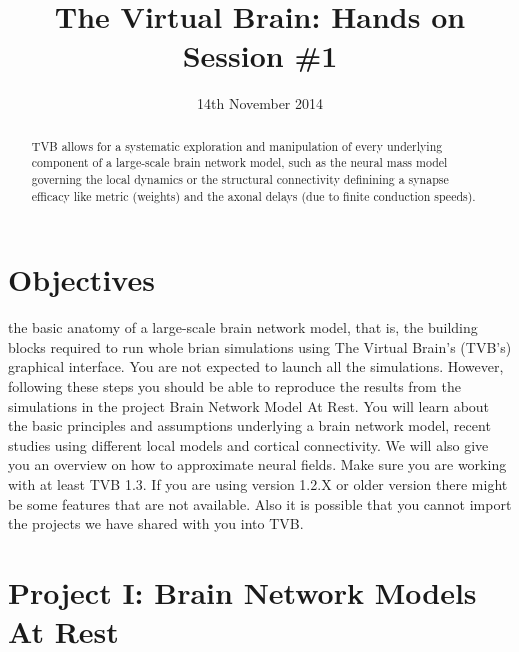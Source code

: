 \documentclass{tufte-handout}
\title{The Virtual Brain: Hands on Session \#1}
\date{14th November 2014}
\begin{document}

\newpage
\ClearWallPaper
\begin{abstract}
\noindent TVB allows for a systematic exploration and manipulation of every
underlying component of a large-scale brain network model, such as the neural
mass model governing the local dynamics  or the structural connectivity definining a synapse efficacy like metric (weights) and the axonal delays (due to finite conduction speeds).
\begin{marginfigure}%
  \label{fig:marginfig}
\end{marginfigure}
\end{abstract}

\section{Objectives}\label{sec:objectives}

the basic anatomy of a large-scale brain network model, that is, the building
blocks required to run whole brian simulations using The Virtual Brain's
(TVB's) graphical interface. You are not expected to launch all the
simulations. However, following these steps you should be able to reproduce
the results from the simulations in the project Brain Network Model At Rest.
You will learn about the basic principles and assumptions underlying a brain
network model, recent studies using different local models and cortical
connectivity. We will also give you an overview on how to approximate neural
fields. Make sure you are working with at least TVB 1.3. If you are using
version 1.2.X or older version there might be some features that are not
available. Also it is possible that you cannot import the projects we have
shared with you into TVB.


\section{Project I: Brain Network Models At Rest}\label{sec:project_data}
\end{document}
